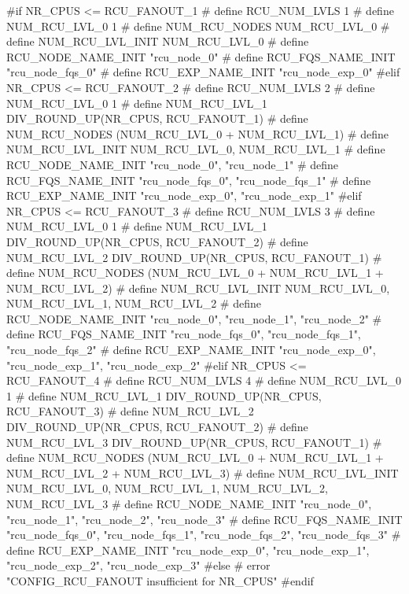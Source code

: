 \begin{fcvlabel}
\begin{VerbatimN}[breaklines=true,commandchars=\%\@\$]
	#if NR_CPUS <= RCU_FANOUT_1       %
	#  define RCU_NUM_LVLS        1         %
	#  define NUM_RCU_LVL_0        1        %
	#  define NUM_RCU_NODES        NUM_RCU_LVL_0
	#  define NUM_RCU_LVL_INIT    { NUM_RCU_LVL_0 }
	#  define RCU_NODE_NAME_INIT  { "rcu_node_0" }  %
	#  define RCU_FQS_NAME_INIT   { "rcu_node_fqs_0" }
	#  define RCU_EXP_NAME_INIT   { "rcu_node_exp_0" }  %
	#elif NR_CPUS <= RCU_FANOUT_2
	#  define RCU_NUM_LVLS        2         %
	#  define NUM_RCU_LVL_0        1        %
	#  define NUM_RCU_LVL_1        DIV_ROUND_UP(NR_CPUS, RCU_FANOUT_1) %
	#  define NUM_RCU_NODES        (NUM_RCU_LVL_0 + NUM_RCU_LVL_1)
	#  define NUM_RCU_LVL_INIT    { NUM_RCU_LVL_0, NUM_RCU_LVL_1 }
	#  define RCU_NODE_NAME_INIT  { "rcu_node_0", "rcu_node_1" } %
	#  define RCU_FQS_NAME_INIT   { "rcu_node_fqs_0", "rcu_node_fqs_1" }
	#  define RCU_EXP_NAME_INIT   { "rcu_node_exp_0", "rcu_node_exp_1" } %
	#elif NR_CPUS <= RCU_FANOUT_3
	#  define RCU_NUM_LVLS        3         %
	#  define NUM_RCU_LVL_0        1        %
	#  define NUM_RCU_LVL_1        DIV_ROUND_UP(NR_CPUS, RCU_FANOUT_2) %
	#  define NUM_RCU_LVL_2        DIV_ROUND_UP(NR_CPUS, RCU_FANOUT_1) %
	#  define NUM_RCU_NODES        (NUM_RCU_LVL_0 + NUM_RCU_LVL_1 + NUM_RCU_LVL_2)
	#  define NUM_RCU_LVL_INIT    { NUM_RCU_LVL_0, NUM_RCU_LVL_1, NUM_RCU_LVL_2 }
	#  define RCU_NODE_NAME_INIT  { "rcu_node_0", "rcu_node_1", "rcu_node_2" } %
	#  define RCU_FQS_NAME_INIT   { "rcu_node_fqs_0", "rcu_node_fqs_1", "rcu_node_fqs_2" }
	#  define RCU_EXP_NAME_INIT   { "rcu_node_exp_0", "rcu_node_exp_1", "rcu_node_exp_2" } %
	#elif NR_CPUS <= RCU_FANOUT_4
	#  define RCU_NUM_LVLS        4         %
	#  define NUM_RCU_LVL_0        1        %
	#  define NUM_RCU_LVL_1        DIV_ROUND_UP(NR_CPUS, RCU_FANOUT_3) %
	#  define NUM_RCU_LVL_2        DIV_ROUND_UP(NR_CPUS, RCU_FANOUT_2)
	#  define NUM_RCU_LVL_3        DIV_ROUND_UP(NR_CPUS, RCU_FANOUT_1) %
	#  define NUM_RCU_NODES        (NUM_RCU_LVL_0 + NUM_RCU_LVL_1 + NUM_RCU_LVL_2 + NUM_RCU_LVL_3)
	#  define NUM_RCU_LVL_INIT    { NUM_RCU_LVL_0, NUM_RCU_LVL_1, NUM_RCU_LVL_2, NUM_RCU_LVL_3 }
	#  define RCU_NODE_NAME_INIT  { "rcu_node_0", "rcu_node_1", "rcu_node_2", "rcu_node_3" } %
	#  define RCU_FQS_NAME_INIT   { "rcu_node_fqs_0", "rcu_node_fqs_1", "rcu_node_fqs_2", "rcu_node_fqs_3" }
	#  define RCU_EXP_NAME_INIT   { "rcu_node_exp_0", "rcu_node_exp_1", "rcu_node_exp_2", "rcu_node_exp_3" }  %
	#else         %
	# error "CONFIG_RCU_FANOUT insufficient for NR_CPUS"
	#endif        %
\end{VerbatimN}
\end{fcvlabel}

